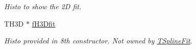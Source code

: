 \begin{DoxyCompactItemize}
\begin{DoxyCompactList}\small\item\em Histo to show the 2D fit. \item\end{DoxyCompactList}\item 
\hypertarget{classTSplineFit_a2c1b604dda9cf4250aa0e285be32dc08}{
TH3D $\ast$ \hyperlink{classTSplineFit_a2c1b604dda9cf4250aa0e285be32dc08}{fH3Dfit}}
\label{classTSplineFit_a2c1b604dda9cf4250aa0e285be32dc08}

\begin{DoxyCompactList}\small\item\em Histo provided in 8th constructor. Not owned by \hyperlink{classTSplineFit}{TSplineFit}. \item\end{DoxyCompactList}\end{DoxyCompactItemize}
